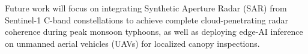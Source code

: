 \documentclass[conference]{IEEEtran}
\begin{document}
Future work will focus on integrating Synthetic Aperture Radar (SAR) from Sentinel-1 C-band constellations to achieve complete cloud-penetrating radar coherence during peak monsoon typhoons, as well as deploying edge-AI inference on unmanned aerial vehicles (UAVs) for localized canopy inspections.



\end{document}
